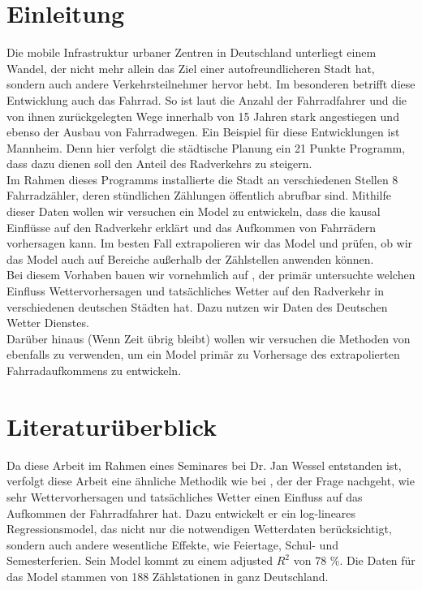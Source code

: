 \documentclass[a4paper,12pt]{thesis}
\begin{document}





\chapter{Einleitung}

Die mobile Infrastruktur urbaner Zentren in Deutschland unterliegt einem Wandel, der nicht mehr allein das Ziel einer autofreundlicheren Stadt hat, sondern auch andere Verkehrsteilnehmer hervor hebt. Im besonderen betrifft diese Entwicklung auch das Fahrrad. So ist laut \cite{Nobis2019} die Anzahl der Fahrradfahrer und die von ihnen zurückgelegten Wege innerhalb von 15 Jahren stark angestiegen und ebenso der Ausbau von Fahrradwegen. Ein Beispiel für diese Entwicklungen ist Mannheim. Denn hier verfolgt die städtische Planung ein 21 Punkte Programm, dass dazu dienen soll den Anteil des Radverkehrs zu steigern.\\
Im Rahmen dieses Programms installierte die Stadt an verschiedenen Stellen 8 Fahrradzähler, deren stündlichen Zählungen öffentlich abrufbar sind. Mithilfe dieser Daten wollen wir versuchen ein Model zu entwickeln, dass die kausal Einflüsse auf den Radverkehr erklärt und das Aufkommen von Fahrrädern vorhersagen kann. Im besten Fall extrapolieren wir das Model und prüfen, ob wir das Model auch auf Bereiche außerhalb der Zählstellen anwenden können.\\
Bei diesem Vorhaben bauen wir vornehmlich auf \cite{Wessel2020}, der primär untersuchte welchen Einfluss Wettervorhersagen und tatsächliches Wetter auf den Radverkehr in verschiedenen deutschen Städten hat. Dazu nutzen wir Daten des Deutschen Wetter Dienstes.\\
Darüber hinaus (Wenn Zeit übrig bleibt) wollen wir versuchen die Methoden von \cite{PRATI201744} ebenfalls zu verwenden, um ein Model primär zu Vorhersage des extrapolierten Fahrradaufkommens zu entwickeln.

\chapter{Literaturüberblick}

Da diese Arbeit im Rahmen eines Seminares bei Dr. Jan Wessel entstanden ist, verfolgt diese Arbeit eine ähnliche Methodik wie bei \cite{Wessel2020}, der der Frage nachgeht, wie sehr Wettervorhersagen und tatsächliches Wetter einen Einfluss auf das Aufkommen der Fahrradfahrer hat. Dazu entwickelt er ein log-lineares Regressionsmodel, das nicht nur die notwendigen Wetterdaten berücksichtigt, sondern auch andere wesentliche Effekte, wie Feiertage, Schul- und Semesterferien. Sein Model kommt zu einem adjusted $R^2$ von 78 \%. Die Daten für das Model stammen von 188 Zählstationen in ganz Deutschland.\\
\end{document}
